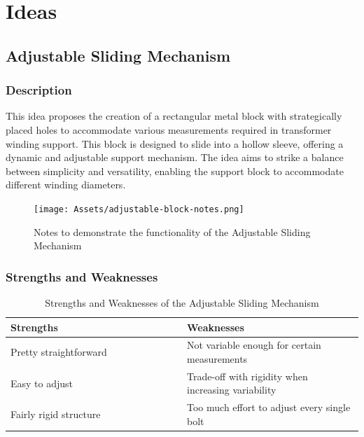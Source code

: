 \documentclass[a4paper,10pt]{article}
\begin{document}
\section{Ideas}

\subsection{Adjustable Sliding Mechanism}

\subsubsection{Description}

This idea proposes the creation of a rectangular metal block with strategically placed holes to accommodate various measurements required in transformer winding support. This block is designed to slide into a hollow sleeve, offering a dynamic and adjustable support mechanism. The idea aims to strike a balance between simplicity and versatility, enabling the support block to accommodate different winding diameters.

\begin{figure}[H]
  \centering
  \texttt{[image: Assets/adjustable-block-notes.png]}
  \caption{Notes to demonstrate the functionality of the Adjustable Sliding Mechanism}
  \label{fig:adjustable-block-notes}
\end{figure}

\subsubsection{Strengths and Weaknesses}

\begin{table}[h]
  \centering
  \begin{tabular}{p{0.5\linewidth} | p{0.5\linewidth}}
    Strengths                                              & Weaknesses \\ \hline
    \textbullet{} Pretty straightforward                   & \textbullet{} Not variable enough for certain measurements \\
    \textbullet{} Easy to adjust                            & \textbullet{} Trade-off with rigidity when increasing variability \\
    \textbullet{} Fairly rigid structure                    & \textbullet{} Too much effort to adjust every single bolt \\
  \end{tabular}
  \caption{Strengths and Weaknesses of the Adjustable Sliding Mechanism}
  \label{table:adjustable-block-pros-cons}
\end{table}


\pagebreak
\printglossaries
\end{document}
